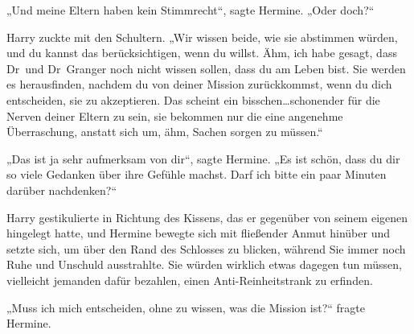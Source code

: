 „Und meine Eltern haben kein Stimmrecht“, sagte Hermine. „Oder doch?“

Harry zuckte mit den Schultern. „Wir wissen beide, wie sie abstimmen würden, und du kannst das berücksichtigen, wenn du willst. Ähm, ich habe gesagt, dass Dr~und Dr~Granger noch nicht wissen sollen, dass du am Leben bist. Sie werden es herausfinden, nachdem du von deiner Mission zurückkommst, wenn du dich entscheiden, sie zu akzeptieren. Das scheint ein bisschen…schonender für die Nerven deiner Eltern zu sein, sie bekommen nur die eine angenehme Überraschung, anstatt sich um, ähm, Sachen sorgen zu müssen.“

„Das ist ja sehr aufmerksam von dir“, sagte Hermine. „Es ist schön, dass du dir so viele Gedanken über ihre Gefühle machst. Darf ich bitte ein paar Minuten darüber nachdenken?“

Harry gestikulierte in Richtung des Kissens, das er gegenüber von seinem eigenen hingelegt hatte, und Hermine bewegte sich mit fließender Anmut hinüber und setzte sich, um über den Rand des Schlosses zu blicken, während Sie immer noch Ruhe und Unschuld ausstrahlte.
Sie würden wirklich etwas dagegen tun müssen, vielleicht jemanden dafür bezahlen, einen Anti-Reinheitstrank zu erfinden.

„Muss ich mich entscheiden, ohne zu wissen, was die Mission ist?“ fragte Hermine.

